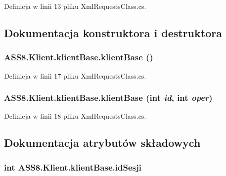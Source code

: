 Definicja w linii 13 pliku XmlRequestsClass.cs.

\subsection{Dokumentacja konstruktora i destruktora}
\hypertarget{a00007_04276cdf60f7e66500f18bcfb19b67cc}{
\subsubsection[{klientBase}]{\setlength{\rightskip}{0pt plus 5cm}ASS8.Klient.klientBase.klientBase ()}}
\label{de/d5e/a00007_04276cdf60f7e66500f18bcfb19b67cc}




Definicja w linii 17 pliku XmlRequestsClass.cs.\hypertarget{a00007_32b59b552ea509fedbaa45a54d8b6d4b}{
\subsubsection[{klientBase}]{\setlength{\rightskip}{0pt plus 5cm}ASS8.Klient.klientBase.klientBase (int {\em id}, \/  int {\em oper})}}
\label{de/d5e/a00007_32b59b552ea509fedbaa45a54d8b6d4b}




Definicja w linii 18 pliku XmlRequestsClass.cs.

\subsection{Dokumentacja atrybutów składowych}
\hypertarget{a00007_f34be337f7af90ae43a8a7df4f481a52}{
\subsubsection[{idSesji}]{\setlength{\rightskip}{0pt plus 5cm}int {\bf ASS8.Klient.klientBase.idSesji}}}
\label{de/d5e/a00007_f34be337f7af90ae43a8a7df4f481a52}




